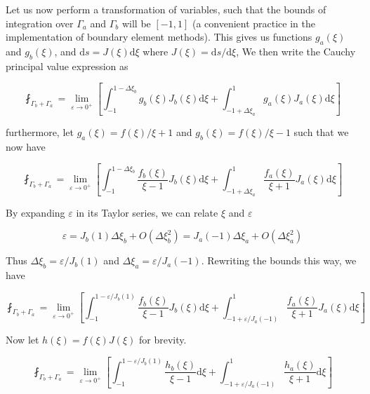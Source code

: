 Let us now perform a transformation of variables, such that the bounds of integration over $\Gamma_a$ and $\Gamma_b$ will be $[-1,1]$ (a convenient practice in the implementation of boundary element methods). This gives us functions $g_a(\xi)$ and $g_b(\xi)$, and $\mathrm{d}s = J(\xi) \mathrm{d}\xi$ where $J(\xi) = \mathrm{d}s/\mathrm{d}\xi$, We then write the Cauchy principal value expression as


\begin{equation}
\fint_{\Gamma_b + \Gamma_a} = \lim_{ \varepsilon \rightarrow 0^+} \left[ \int_{-1}^{1 -\Delta \xi_b} g_b(\xi) J_b(\xi) \mathrm{d}\xi + \int_{-1 + \Delta \xi_a}^{1} g_a(\xi) J_a(\xi) \mathrm{d}\xi \right]
\end{equation}

furthermore, let $g_a(\xi) = f(\xi)/\xi+1$ and $g_b(\xi) = f(\xi)/\xi-1$ such that we now have

\begin{equation}
\fint_{\Gamma_b + \Gamma_a} = \lim_{ \varepsilon \rightarrow 0^+} \left[ \int_{-1}^{1 -\Delta \xi_b} \frac{f_b(\xi)}{\xi-1} J_b(\xi) \mathrm{d}\xi + \int_{-1 + \Delta \xi_a}^{1} \frac{f_a(\xi)}{\xi+1} J_a(\xi) \mathrm{d}\xi \right]
\end{equation}

By expanding $\varepsilon$ in its Taylor series, we can relate $\xi$ and $\varepsilon$

\begin{equation}
\varepsilon = J_b(1) \Delta \xi_b + O(\Delta \xi_b^2) = J_a(-1) \Delta \xi_a + O(\Delta \xi_a^2)
\end{equation}

Thus $\Delta \xi_b = \varepsilon/J_b(1)$ and $\Delta \xi_a = \varepsilon/J_a(-1)$. Rewriting the bounds this way, we have 

\begin{equation}
\fint_{\Gamma_b + \Gamma_a} = \lim_{ \varepsilon \rightarrow 0^+} \left[ \int_{-1}^{1 -\varepsilon/J_b(1)} \frac{f_b(\xi)}{\xi-1} J_b(\xi) \mathrm{d}\xi + \int_{-1 + \varepsilon/J_a(-1)}^{1} \frac{f_a(\xi)}{\xi+1} J_a(\xi) \mathrm{d}\xi \right]
\end{equation}

Now let $h(\xi) = f(\xi)J(\xi)$ for brevity. 

\begin{equation}
\fint_{\Gamma_b + \Gamma_a} = \lim_{ \varepsilon \rightarrow 0^+} \left[ \int_{-1}^{1 -\varepsilon/J_b(1)} \frac{h_b(\xi)}{\xi-1} \mathrm{d}\xi + \int_{-1 + \varepsilon/J_a(-1)}^{1} \frac{h_a(\xi)}{\xi+1} \mathrm{d}\xi \right]
\end{equation}


